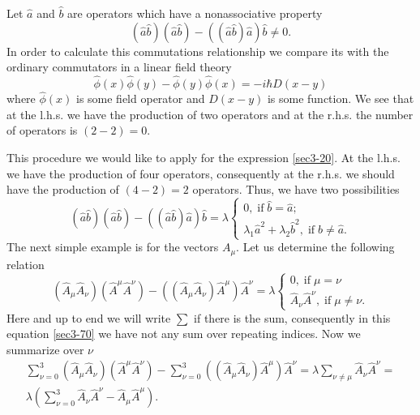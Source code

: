 \documentclass[a4paper,a4paper]{article}
\begin{document}
Let $\hat a$ and $\hat b$ are operators which have a nonassociative property
\begin{equation}
\left ( \hat a \hat b\right ) \left ( \hat a \hat b\right ) - 
\left ( \left (\hat a \hat b \right ) \hat a \right ) \hat b  
\neq 0 . 
\label{sec3-20}
\end{equation}
In order to calculate this commutations relationship we compare its 
with the ordinary commutators in a linear field theory 
\begin{equation}
\hat \phi (x) \hat \phi (y) - \hat \phi (y) \hat \phi (x) = 
-i \hbar D(x - y) 
\label{sec3-50}
\end{equation}
where $\hat \phi (x)$ is some field operator and $D(x - y)$ is some function. 
We see that at the l.h.s. we have the production of two 
operators and at the r.h.s. the number of operators is 
$(2-2)=0$. 
\par 
This procedure we would like to apply for the expression \eqref{sec3-20}. 
At the l.h.s. we have the production of four operators, consequently 
at the r.h.s. we should have the production of 
$(4-2)=2$ operators. Thus, we have two possibilities 
\begin{equation}
\left ( \hat a \hat b\right ) \left ( \hat a \hat b\right ) - 
\left ( \left ( \hat a \hat b \right ) \hat a \right ) \hat b = 
\lambda 
\begin{cases}
    0 , \; \text{if} \; \hat{b} = \hat{a} ; \\
    \lambda_1\hat{a}^2 + \lambda_2 \hat{b}^2, \; \text{if} \; 
    \hat{b} \neq \hat{a} . 
\end{cases} 
\label{sec3-60}
\end{equation}
The next simple example is for the vectors $A_\mu$. 
Let us determine the following relation 
\begin{equation}
  \left( 
  \hat{A}_\mu \hat{A}_\nu
  \right)
  \left( 
  \hat{A}^\mu \hat{A}^\nu
  \right ) - 
  \left( \left( \hat{A}_\mu \hat{A}_\nu 
  \right) \hat{A}^\mu \right ) \hat{A}^\nu = 
  \lambda 
  \begin{cases}
    0 , \; \text{if} \; \mu = \nu \\
    \hat{A}_\nu \hat{A}^\nu , \; \text{if} \; 
    \mu \neq \nu .
  \end{cases}    
\label{sec3-70}
\end{equation}
Here and up to end we will write $\sum$ if there is the sum, consequently 
in this equation \eqref{sec3-70} we have not any sum over repeating 
indices. Now we summarize over $\nu$ 
\begin{equation}
\begin{split}
  \sum^3_{\nu = 0} \left( 
  \hat{A}_\mu \hat{A}_\nu
  \right)
  \left( 
  \hat{A}^\mu \hat{A}^\nu
  \right ) - 
  \sum^3_{\nu = 0} \left( \left( \hat{A}_\mu \hat{A}_\nu 
  \right) \hat{A}^\mu \right ) \hat{A}^\nu = 
  \lambda \sum_{\nu \neq \mu} \hat A_\nu \hat A^\nu = \\ 
  \lambda 
  \left(
  \sum^3_{\nu =0 } \hat A_\nu \hat A^\nu - 
  \hat A_\mu \hat A^\mu 
  \right). 
\label{sec3-80}
\end{split}
\end{equation}
\end{document}
